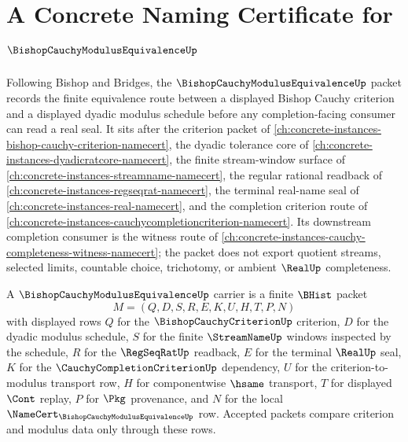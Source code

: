 \chapter{A Concrete Naming Certificate for $\BishopCauchyModulusEquivalenceUp$}
\label{ch:concrete-instances-bishop-cauchy-modulus-equivalence-namecert}

Following Bishop and Bridges, the $\BishopCauchyModulusEquivalenceUp$ packet records the finite equivalence route between a displayed Bishop Cauchy criterion and a displayed dyadic modulus schedule before any completion-facing consumer can read a real seal. It sits after the criterion packet of \autoref{ch:concrete-instances-bishop-cauchy-criterion-namecert}, the dyadic tolerance core of \autoref{ch:concrete-instances-dyadicratcore-namecert}, the finite stream-window surface of \autoref{ch:concrete-instances-streamname-namecert}, the regular rational readback of \autoref{ch:concrete-instances-regseqrat-namecert}, the terminal real-name seal of \autoref{ch:concrete-instances-real-namecert}, and the completion criterion route of \autoref{ch:concrete-instances-cauchycompletioncriterion-namecert}. Its downstream completion consumer is the witness route of \autoref{ch:concrete-instances-cauchy-completeness-witness-namecert}; the packet does not export quotient streams, selected limits, countable choice, trichotomy, or ambient $\RealUp$ completeness.

\begin{definition}
\label{def:bishop-cauchy-modulus-equivalence-carrier}
A $\BishopCauchyModulusEquivalenceUp$ carrier is a finite $\BHist$ packet
$$
M=(Q,D,S,R,E,K,U,H,T,P,N)
$$
with displayed rows $Q$ for the $\BishopCauchyCriterionUp$ criterion, $D$ for the dyadic modulus schedule, $S$ for the finite $\StreamNameUp$ windows inspected by the schedule, $R$ for the $\RegSeqRatUp$ readback, $E$ for the terminal $\RealUp$ seal, $K$ for the $\CauchyCompletionCriterionUp$ dependency, $U$ for the criterion-to-modulus transport row, $H$ for componentwise $\hsame$ transport, $T$ for displayed $\Cont$ replay, $P$ for $\Pkg$ provenance, and $N$ for the local $\NameCert_{\BishopCauchyModulusEquivalenceUp}$ row. Accepted packets compare criterion and modulus data only through these rows.
\end{definition}

